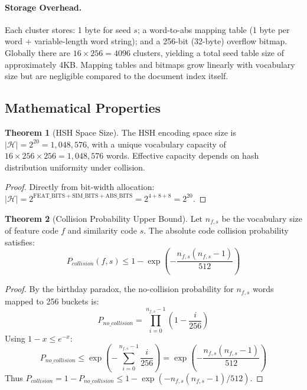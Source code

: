 \documentclass[11pt,a4paper]{article}
\theoremstyle{definition}
\newtheorem{theorem}{Theorem}[section]
\begin{document}
\paragraph{Storage Overhead.} Each cluster stores: 1 byte for seed $s$; a word-to-abs mapping table (1 byte per word + variable-length word string); and a 256-bit (32-byte) overflow bitmap. Globally there are $16 \times 256 = 4096$ clusters, yielding a total seed table size of approximately 4KB. Mapping tables and bitmaps grow linearly with vocabulary size but are negligible compared to the document index itself.

\subsection{Mathematical Properties}

\begin{theorem}[HSH Space Size]
The HSH encoding space size is $|\mathcal{H}| = 2^{20} = 1,048,576$, with a unique vocabulary capacity of $16 \times 256 \times 256 = 1,048,576$ words. Effective capacity depends on hash distribution uniformity under collision.
\end{theorem}

\begin{proof}
Directly from bit-width allocation: $|\mathcal{H}| = 2^{\text{FEAT\_BITS} + \text{SIM\_BITS} + \text{ABS\_BITS}} = 2^{4+8+8} = 2^{20}$.
\end{proof}

\begin{theorem}[Collision Probability Upper Bound]
Let $n_{f,s}$ be the vocabulary size of feature code $f$ and similarity code $s$. The absolute code collision probability satisfies:
\begin{equation}
P_{collision}(f, s) \leq 1 - \exp\left(-\frac{n_{f,s}(n_{f,s}-1)}{512}\right)
\end{equation}
\end{theorem}

\begin{proof}
By the birthday paradox, the no-collision probability for $n_{f,s}$ words mapped to 256 buckets is:
\begin{equation}
P_{no\_collision} = \prod_{i=0}^{n_{f,s}-1} \left(1 - \frac{i}{256}\right)
\end{equation}
Using $1 - x \leq e^{-x}$:
\begin{equation}
P_{no\_collision} \leq \exp\left(-\sum_{i=0}^{n_{f,s}-1} \frac{i}{256}\right) = \exp\left(-\frac{n_{f,s}(n_{f,s}-1)}{512}\right)
\end{equation}
Thus $P_{collision} = 1 - P_{no\_collision} \leq 1 - \exp(-n_{f,s}(n_{f,s}-1)/512)$.
\end{proof}
\end{document}
